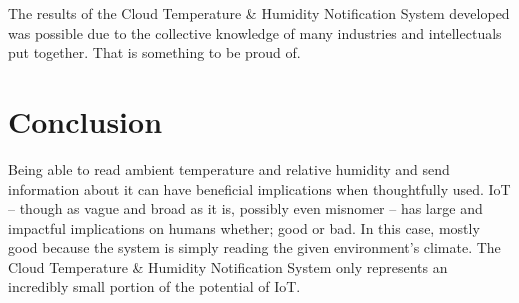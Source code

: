 \documentclass{article}
\begin{document}
The results of the Cloud Temperature \& Humidity Notification System developed was possible due to the collective knowledge of many industries and intellectuals put together. That is something to be proud of.

\section{Conclusion}
Being able to read ambient temperature and relative humidity and send information about it can have beneficial implications when thoughtfully used. IoT -- though as vague and broad as it is, possibly even misnomer -- has large and impactful implications on humans whether; good or bad. In this case, mostly good because the system is simply reading the given environment's climate. The Cloud Temperature \& Humidity Notification System only represents an incredibly small portion of the potential of IoT.
\end{document}

